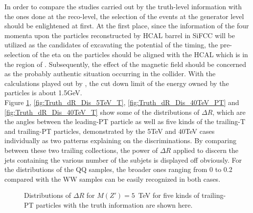In order to compare the studies carried out by the truth-level information with the ones done at the reco-level, the selection of the events at the generator level should be enlightened at first. At the first place, since the information of the four momenta upon the particles reconstructed by HCAL barrel in SiFCC will be utilized as the candidates of excavating the potential of the timing, the pre-selection of the eta on the particles should be aligned with the HCAL which is in the region of . Subsequently, the effect of the magnetic field should be concerned as the probably authentic situation occurring in the collider. With the calculations played out by , the cut down limit of the energy owned by the particles is about 1.5GeV.\\     

Figure \ref{fig:Truth_dR_Dis_5TeV_PT}, \ref{fig:Truth_dR_Dis_5TeV_T}, \ref{fig:Truth_dR_Dis_40TeV_PT} and \ref{fig:Truth_dR_Dis_40TeV_T} show some of the distributions of $\Delta R$, which are the angles between the leading-PT particle as well as five kinds of the trailing-T and trailing-PT particles, demonstrated by the 5TeV and 40TeV cases individually as two patterns explaining on the discriminations. By comparing between these two trailing collections, the power of $\Delta R$ applied to discern the jets containing the various number of the subjets is displayed off obviously. For the distributions of the QQ samples, the broader ones ranging from 0 to 0.2 compared with the WW samples can be easily recognized in both cases. \\

\begin{figure}
\begin{center}
\end{center}
\caption{Distributions of $\Delta R$ for $M(Z') = 5$~TeV for five kinds of trailing-PT particles with the truth information 
are shown here. \label{fig:Truth_dR_Dis_5TeV_PT}}
\end{figure}


